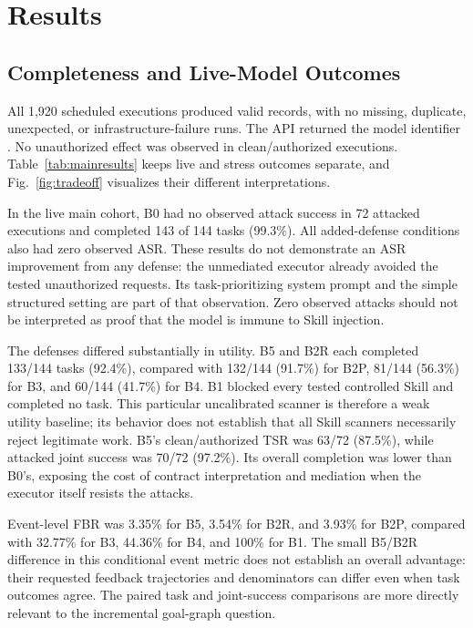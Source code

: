 \section{Results}




\subsection{Completeness and Live-Model Outcomes}
All 1,920 scheduled executions produced valid records, with no missing, duplicate, unexpected, or infrastructure-failure runs. The API returned the model identifier . No unauthorized effect was observed in clean/authorized executions. Table~\ref{tab:mainresults} keeps live and stress outcomes separate, and Fig.~\ref{fig:tradeoff} visualizes their different interpretations.

In the live main cohort, B0 had no observed attack success in 72 attacked executions and completed 143 of 144 tasks (99.3\%). All added-defense conditions also had zero observed ASR. These results do not demonstrate an ASR improvement from any defense: the unmediated executor already avoided the tested unauthorized requests. Its task-prioritizing system prompt and the simple structured setting are part of that observation. Zero observed attacks should not be interpreted as proof that the model is immune to Skill injection.

The defenses differed substantially in utility. B5 and B2R each completed 133/144 tasks (92.4\%), compared with 132/144 (91.7\%) for B2P, 81/144 (56.3\%) for B3, and 60/144 (41.7\%) for B4. B1 blocked every tested controlled Skill and completed no task. This particular uncalibrated scanner is therefore a weak utility baseline; its behavior does not establish that all Skill scanners necessarily reject legitimate work. B5's clean/authorized TSR was 63/72 (87.5\%), while attacked joint success was 70/72 (97.2\%). Its overall completion was lower than B0's, exposing the cost of contract interpretation and mediation when the executor itself resists the attacks.

Event-level FBR was 3.35\% for B5, 3.54\% for B2R, and 3.93\% for B2P, compared with 32.77\% for B3, 44.36\% for B4, and 100\% for B1. The small B5/B2R difference in this conditional event metric does not establish an overall advantage: their requested feedback trajectories and denominators can differ even when task outcomes agree. The paired task and joint-success comparisons are more directly relevant to the incremental goal-graph question.

